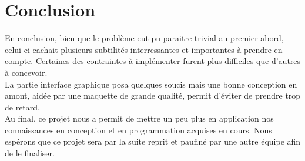 \documentclass[final, noposter]{polytech/polytech}
\begin{document}
\chapter{Conclusion}
	En conclusion, bien que le problème eut pu paraitre trivial au premier abord, celui-ci cachait plusieurs subtilités interressantes et importantes à prendre en compte. Certaines des contraintes à implémenter furent plus difficiles que d'autres à concevoir. \\
	La partie interface graphique posa quelques soucis mais une bonne conception en amont, aidée par une maquette de grande qualité, permit d'éviter de prendre trop de retard. \\
	Au final, ce projet nous a permit de mettre un peu plus en application nos connaissances en conception et en programmation acquises en cours. Nous espérons que ce projet sera par la suite reprit et paufiné par une autre équipe afin de le finaliser.
\end{document}

